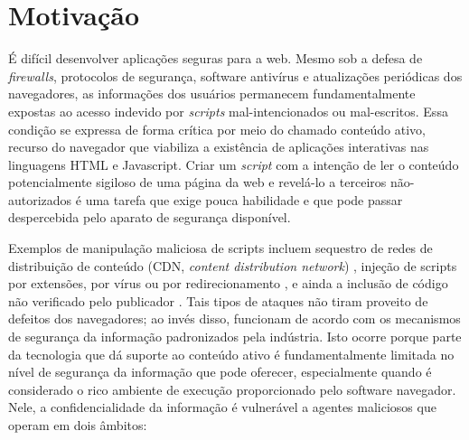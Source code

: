 \section{Motivação}


É difícil desenvolver aplicações seguras para a web. Mesmo sob a defesa de \textit{firewalls}, protocolos de segurança, software antivírus e atualizações periódicas dos navegadores, as informações dos usuários permanecem fundamentalmente expostas ao acesso indevido por \textit{scripts} mal-intencionados ou mal-escritos. Essa condição se expressa de forma crítica por meio do chamado conteúdo ativo, recurso do navegador que viabiliza a existência de aplicações interativas nas linguagens HTML e Javascript. Criar um \textit{script} com a intenção de ler o conteúdo potencialmente sigiloso de uma página da web e revelá-lo a terceiros não-autorizados é uma tarefa que exige pouca habilidade e que pode passar despercebida pelo aparato de segurança disponível.

Exemplos de manipulação maliciosa de scripts incluem sequestro de redes de distribuição de conteúdo (CDN, \textit{content distribution network}) \cite{Dorfman2013}, injeção de scripts por extensões, por vírus ou por redirecionamento \cite{Kinlan2015}, e ainda a inclusão de código não verificado pelo publicador \cite{Vanunu2016}. Tais tipos de ataques não tiram proveito de defeitos dos navegadores; ao invés disso, funcionam de acordo com os mecanismos de segurança da informação padronizados pela indústria. Isto ocorre porque parte da tecnologia que dá suporte ao conteúdo ativo é fundamentalmente limitada no nível de segurança da informação que pode oferecer, especialmente quando é considerado o rico ambiente de execução proporcionado pelo software navegador. Nele, a confidencialidade da informação é vulnerável a agentes maliciosos que operam em dois âmbitos:

